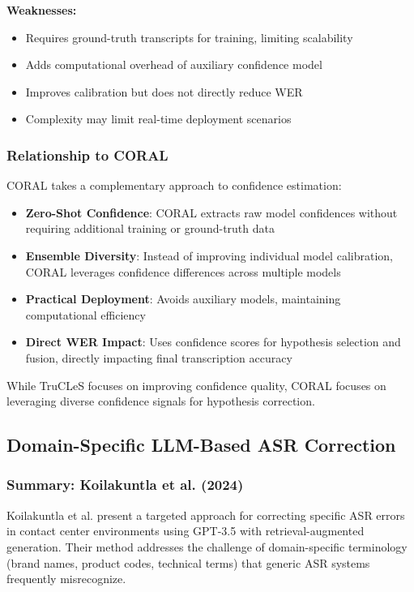 \textbf{Weaknesses:}
\begin{itemize}
    \item Requires ground-truth transcripts for training, limiting scalability
    \item Adds computational overhead of auxiliary confidence model
    \item Improves calibration but does not directly reduce WER
    \item Complexity may limit real-time deployment scenarios
\end{itemize}

\subsubsection{Relationship to CORAL}

CORAL takes a complementary approach to confidence estimation:

\begin{itemize}
    \item \textbf{Zero-Shot Confidence}: CORAL extracts raw model confidences without requiring additional training or ground-truth data
    \item \textbf{Ensemble Diversity}: Instead of improving individual model calibration, CORAL leverages confidence differences across multiple models
    \item \textbf{Practical Deployment}: Avoids auxiliary models, maintaining computational efficiency
    \item \textbf{Direct WER Impact}: Uses confidence scores for hypothesis selection and fusion, directly impacting final transcription accuracy
\end{itemize}

While TruCLeS focuses on improving confidence quality, CORAL focuses on leveraging diverse confidence signals for hypothesis correction.

\subsection{Domain-Specific LLM-Based ASR Correction}

\subsubsection{Summary: Koilakuntla et al. (2024)}

Koilakuntla et al. \cite{koilakuntla2024} present a targeted approach for correcting specific ASR errors in contact center environments using GPT-3.5 with retrieval-augmented generation. Their method addresses the challenge of domain-specific terminology (brand names, product codes, technical terms) that generic ASR systems frequently misrecognize.

